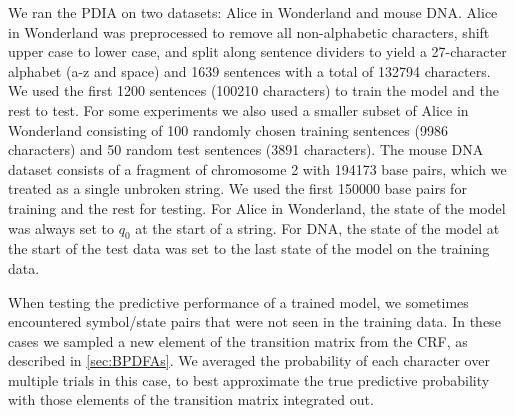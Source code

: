 We ran the PDIA on two datasets: Alice in Wonderland and mouse DNA.  Alice in Wonderland was preprocessed to remove all non-alphabetic characters, shift upper case to lower case, and split along sentence dividers to yield a 27-character alphabet (a-z and space) and 1639 sentences with a total of 132794 characters.  We used the first 1200 sentences (100210 characters) to train the model and the rest to test.  For some experiments we also used a smaller subset of Alice in Wonderland consisting of 100 randomly chosen training sentences (9986 characters) and 50 random test sentences (3891 characters).  The mouse DNA dataset consists of a fragment of chromosome 2 with 194173 base pairs, which we treated as a single unbroken string.  We used the first 150000 base pairs for training and the rest for testing.  For Alice in Wonderland, the state of the model was always set to $q_0$ at the start of a string.  For DNA, the state of the model at the start of the test data was set to the last state of the model on the training data.

When testing the predictive performance of a trained model, we sometimes encountered symbol/state pairs that were not seen in the training data.  In these cases we sampled a new element of the transition matrix from the CRF, as described in \ref{sec:BPDFAs}.  We averaged the probability of each character over multiple trials in this case, to best approximate the true predictive probability with those elements of the transition matrix integrated out.